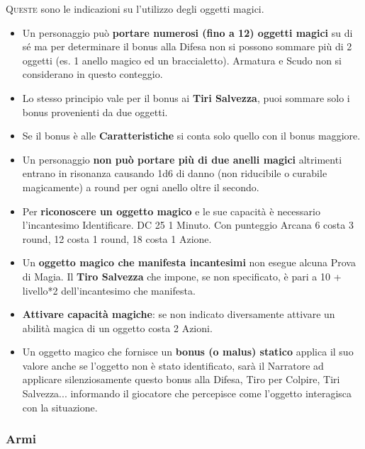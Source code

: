 \begin{multicols}{2}

\lettrine[lines=2, lhang=0.33, loversize=0.25, findent=1.5em]{Q}{ueste} sono le indicazioni su l'utilizzo degli oggetti magici.

\label{oggetti-magici}
\begin{itemize}
\item
Un personaggio può \textbf{portare numerosi (fino a 12) oggetti magici} su di sé ma per determinare il bonus alla Difesa non si possono sommare più di 2 oggetti (es. 1 anello magico ed un braccialetto). Armatura e Scudo non si considerano in questo conteggio.
\item
Lo stesso principio vale per il bonus ai \textbf{Tiri Salvezza}, puoi sommare solo i bonus provenienti da due oggetti.
\item
Se il bonus è alle \textbf{Caratteristiche} si conta solo quello con il bonus maggiore.
\item
Un personaggio \textbf{non può portare più di due anelli magici} altrimenti entrano in risonanza causando 1d6 di danno (non riducibile o curabile magicamente) a round per ogni anello oltre il secondo.
\item
Per \textbf{riconoscere un oggetto magico} e le sue capacità è necessario l'incantesimo Identificare. DC 25 1 Minuto. Con punteggio Arcana 6 costa 3 round, 12 costa 1 round, 18 costa 1 Azione.
\item
Un \textbf{oggetto magico che manifesta incantesimi} non esegue alcuna Prova di Magia. Il \textbf{Tiro Salvezza} che impone, se non specificato, è pari a 10 + livello*2 dell'incantesimo che manifesta.
\item
\textbf{Attivare capacità magiche}: se non indicato diversamente attivare un abilità magica di un oggetto costa 2 Azioni.
\item
Un oggetto magico che fornisce un \textbf{bonus (o malus) statico} applica il suo valore anche se l'oggetto non è stato identificato, sarà il Narratore ad applicare silenziosamente questo bonus alla Difesa, Tiro per Colpire, Tiri Salvezza... informando il giocatore che percepisce come l'oggetto interagisca con la situazione.

\end{itemize}

\subsubsection{Armi}


\end{multicols}
